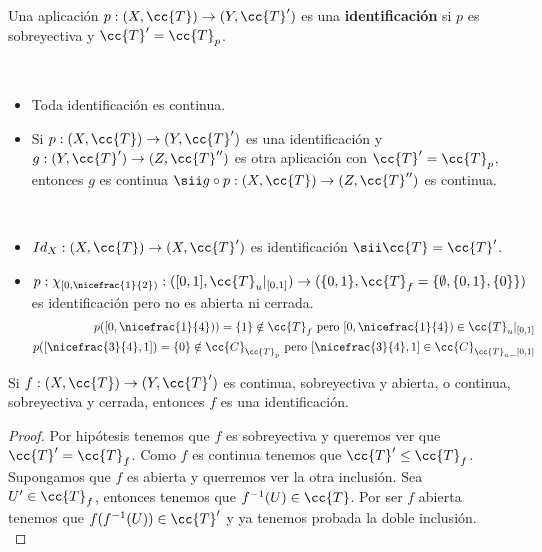 \begin{definicion}
    Una aplicación $p:(X, \cc{T})\to (Y, \cc{T}')$ es una \textbf{identificación} si $p$ es sobreyectiva y $\cc{T}'=\cc{T}_p$.
    \endsquare
\end{definicion}

\begin{observacion}\
    \begin{itemize}
        \item Toda identificación es continua.
        \item Si $p:(X, \cc{T})\to (Y, \cc{T}')$ es una identificación y $g:(Y, \cc{T}')\to(Z, \cc{T}'')$ es otra aplicación con $\cc{T}'=\cc{T}_p$, entonces $g$ es continua $\sii g\circ p: (X, \cc{T})\to (Z, \cc{T}'')$ es continua.
    \end{itemize}
\end{observacion}

\begin{ejemplo}\
    \begin{itemize}
        \item $Id_X:(X, \cc{T})\to (X, \cc{T}')$ es identificación $\sii \cc{T}=\cc{T}'$.
        \item $p: \chi_{[0,\nicefrac{1}{2})}:([0,1], \cc{T}_u|_{[0,1]})\to (\{0,1\}, \cc{T}_f=\{\emptyset, \{0,1\}, \{0\}\})$ es identificación pero no es abierta ni cerrada.
        \begin{align*}
            p([0,\nicefrac{1}{4})) = \{1\}\notin \cc{T}_f \text{ pero } [0,\nicefrac{1}{4})\in \cc{T}_u|_{[0,1]}\\
            p([\nicefrac{3}{4}, 1])=\{0\}\notin \cc{C}_{\cc{T}_p} \text{ pero } [\nicefrac{3}{4}, 1] \in \cc{C}_{\cc{T}_u\_{[0,1]}}
        \end{align*}
    \end{itemize}
    \endsquare
\end{ejemplo}

\begin{prop}
    Si $f:(X, \cc{T})\to (Y, \cc{T}')$ es continua, sobreyectiva y abierta, o continua, sobreyectiva y cerrada, entonces $f$ es una identificación.
    \begin{proof}
        Por hipótesis tenemos que $f$ es sobreyectiva y queremos ver que $\cc{T}'=\cc{T}_f$. Como $f$ es continua tenemos que $\cc{T}'\leq \cc{T}_f$. Supongamos que $f$ es abierta y querremos ver la otra inclusión. Sea $U'\in \cc{T}_f$, entonces tenemos que $f^{-1}(U)\in \cc{T}$. Por ser $f$ abierta tenemos que $f(f^{-1}(U))\in \cc{T}'$ y ya tenemos probada la doble inclusión.\\

    \end{proof}
\end{prop}


